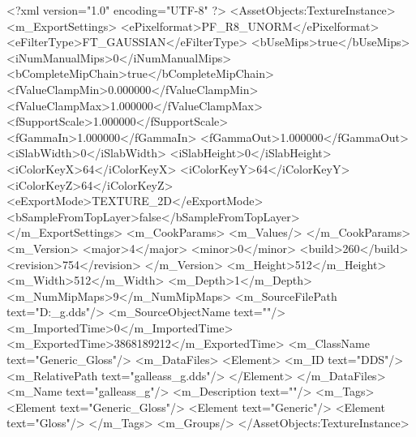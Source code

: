 <?xml version="1.0" encoding="UTF-8" ?>
<AssetObjects:TextureInstance>
	<m_ExportSettings>
		<ePixelformat>PF_R8_UNORM</ePixelformat>
		<eFilterType>FT_GAUSSIAN</eFilterType>
		<bUseMips>true</bUseMips>
		<iNumManualMips>0</iNumManualMips>
		<bCompleteMipChain>true</bCompleteMipChain>
		<fValueClampMin>0.000000</fValueClampMin>
		<fValueClampMax>1.000000</fValueClampMax>
		<fSupportScale>1.000000</fSupportScale>
		<fGammaIn>1.000000</fGammaIn>
		<fGammaOut>1.000000</fGammaOut>
		<iSlabWidth>0</iSlabWidth>
		<iSlabHeight>0</iSlabHeight>
		<iColorKeyX>64</iColorKeyX>
		<iColorKeyY>64</iColorKeyY>
		<iColorKeyZ>64</iColorKeyZ>
		<eExportMode>TEXTURE_2D</eExportMode>
		<bSampleFromTopLayer>false</bSampleFromTopLayer>
	</m_ExportSettings>
	<m_CookParams>
		<m_Values/>
	</m_CookParams>
	<m_Version>
		<major>4</major>
		<minor>0</minor>
		<build>260</build>
		<revision>754</revision>
	</m_Version>
	<m_Height>512</m_Height>
	<m_Width>512</m_Width>
	<m_Depth>1</m_Depth>
	<m_NumMipMaps>9</m_NumMipMaps>
	<m_SourceFilePath text="D:\Units\Galleass\galleass_g.dds"/>
	<m_SourceObjectName text=""/>
	<m_ImportedTime>0</m_ImportedTime>
	<m_ExportedTime>3868189212</m_ExportedTime>
	<m_ClassName text="Generic_Gloss"/>
	<m_DataFiles>
		<Element>
			<m_ID text="DDS"/>
			<m_RelativePath text="galleass_g.dds"/>
		</Element>
	</m_DataFiles>
	<m_Name text="galleass_g"/>
	<m_Description text=""/>
	<m_Tags>
		<Element text="Generic_Gloss"/>
		<Element text="Generic"/>
		<Element text="Gloss"/>
	</m_Tags>
	<m_Groups/>
</AssetObjects:TextureInstance>

 